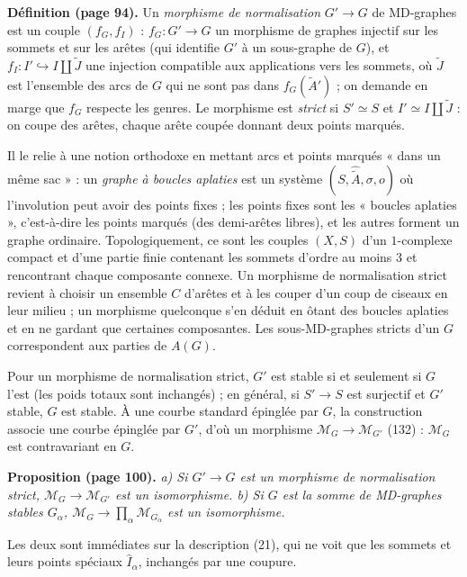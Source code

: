 \documentclass[11pt,a4paper]{article}
\begin{document}
\textbf{Définition (page 94).} Un \emph{morphisme de normalisation} $G' \to G$ de
MD-graphes est un couple $(f_G, f_I)$ : $f_G : G' \to G$ un morphisme de graphes
injectif sur les sommets et sur les arêtes (qui identifie $G'$ à un sous-graphe de
$G$), et $f_I : I' \hookrightarrow I \amalg \widetilde{J}$ une injection compatible
aux applications vers les sommets, où $\widetilde{J}$ est l'ensemble des arcs de
$G$ qui ne sont pas dans $f_G(\widetilde{A}')$ ; on demande en marge que $f_G$
respecte les genres. Le morphisme est \emph{strict} si $S' \simeq S$ et $I' \simeq
I \amalg \widetilde{J}$ : on coupe des arêtes, chaque arête coupée donnant deux
points marqués.

Il le relie à une notion orthodoxe en mettant arcs et points marqués « dans un
même sac » : un \emph{graphe à boucles aplaties} est un système $(S,
\widehat{\widetilde{A}}, \sigma, o)$ où l'involution peut avoir des points fixes ;
les points fixes sont les « boucles aplaties », c'est-à-dire les points marqués
(des demi-arêtes libres), et les autres forment un graphe ordinaire.
Topologiquement, ce sont les couples $(X, S)$ d'un $1$-complexe compact et d'une
partie finie contenant les sommets d'ordre au moins $3$ et rencontrant chaque
composante connexe. Un morphisme de normalisation strict revient à choisir un
ensemble $C$ d'arêtes et à les couper d'un coup de ciseaux en leur milieu ; un
morphisme quelconque s'en déduit en ôtant des boucles aplaties et en ne gardant
que certaines composantes. Les sous-MD-graphes stricts d'un $G$ correspondent aux
parties de $A(G)$.

Pour un morphisme de normalisation strict, $G'$ est stable si et seulement si $G$
l'est (les poids totaux sont inchangés) ; en général, si $S' \to S$ est surjectif
et $G'$ stable, $G$ est stable. À une courbe standard épinglée par $G$, la
construction associe une courbe épinglée par $G'$, d'où un morphisme $\mathcal{M}_G
\to \mathcal{M}_{G'}$ (132) : $\mathcal{M}_G$ est contravariant en $G$.

\textbf{Proposition (page 100).} \emph{a) Si $G' \to G$ est un morphisme de
normalisation strict, $\mathcal{M}_G \to \mathcal{M}_{G'}$ est un isomorphisme.
b) Si $G$ est la somme de MD-graphes stables $G_\alpha$, $\mathcal{M}_G \to
\prod_\alpha \mathcal{M}_{G_\alpha}$ est un isomorphisme.}

Les deux sont immédiates sur la description (21), qui ne voit que les sommets et
leurs points spéciaux $\widehat{I}_\alpha$, inchangés par une coupure.

\end{document}
